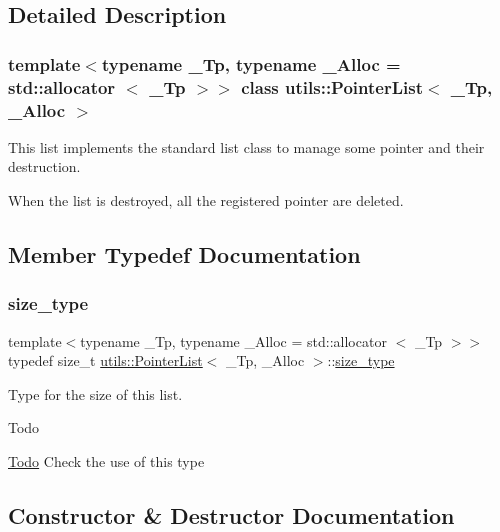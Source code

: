 \subsection{Detailed Description}
\subsubsection*{template$<$typename \+\_\+\+Tp, typename \+\_\+\+Alloc = std\+::allocator $<$ \+\_\+\+Tp $>$$>$\newline
class utils\+::\+Pointer\+List$<$ \+\_\+\+Tp, \+\_\+\+Alloc $>$}

This list implements the standard list class to manage some pointer and their destruction. 

When the list is destroyed, all the registered pointer are deleted. 

\subsection{Member Typedef Documentation}
\mbox{\label{classutils_1_1PointerList_a8d7b485e236a01cc14b41694ae0b3456}} 
\subsubsection{\texorpdfstring{size\+\_\+type}{size\_type}}
{\footnotesize\ttfamily template$<$typename \+\_\+\+Tp, typename \+\_\+\+Alloc = std\+::allocator $<$ \+\_\+\+Tp $>$$>$ \\
typedef size\+\_\+t \hyperlink{classutils_1_1PointerList}{utils\+::\+Pointer\+List}$<$ \+\_\+\+Tp, \+\_\+\+Alloc $>$\+::\hyperlink{classutils_1_1PointerList_a8d7b485e236a01cc14b41694ae0b3456}{size\+\_\+type}}



Type for the size of this list. 

\begin{DoxyRefDesc}{Todo}
\item[\hyperlink{todo__todo000001}{Todo}]Check the use of this type \end{DoxyRefDesc}


\subsection{Constructor \& Destructor Documentation}
\mbox{\label{classutils_1_1PointerList_aabad19d5a33c52b25ea3c7ff65fff4bd}} 
